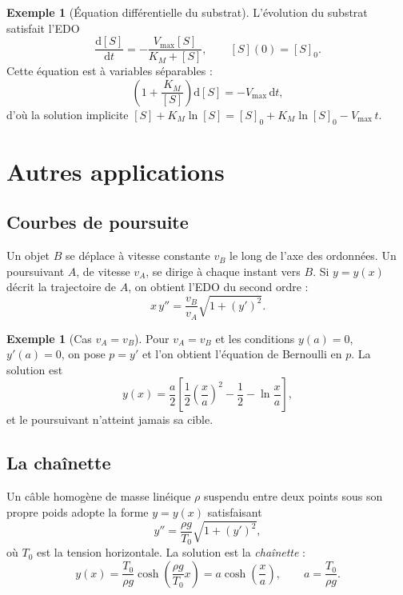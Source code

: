 \documentclass[12pt,a4paper,openany]{book}
\theoremstyle{definition}
\newtheorem{exemple}[definition]{Exemple}
\theoremstyle{plain}
\theoremstyle{remark}
\newcommand{\dd}{\mathrm{d}}
\begin{document}
\begin{exemple}[Équation différentielle du substrat]
\label{ex:edo-substrat}
L'évolution du substrat satisfait l'EDO
\[
\frac{\dd [S]}{\dd t} = -\frac{V_{\max}[S]}{K_M + [S]},
\qquad [S](0) = [S]_0.
\]
Cette équation est à variables séparables :
\[
\left(1 + \frac{K_M}{[S]}\right)\dd[S] = -V_{\max}\, \dd t,
\]
d'où la solution implicite
$[S] + K_M \ln [S] = [S]_0 + K_M \ln [S]_0 - V_{\max}\, t$.
\end{exemple}

\section{Autres applications}
\label{sec:autres-applications}

\subsection{Courbes de poursuite}
\label{subsec:poursuite}

Un objet $B$ se déplace à vitesse constante $v_B$ le long de l'axe
des ordonnées. Un poursuivant $A$, de vitesse $v_A$, se dirige à
chaque instant vers $B$. Si $y = y(x)$ décrit la trajectoire de $A$,
on obtient l'EDO du second ordre :
\begin{equation}
\label{eq:poursuite}
x\, y'' = \frac{v_B}{v_A}\sqrt{1 + (y')^2}.
\end{equation}

\begin{exemple}[Cas $v_A = v_B$]
\label{ex:poursuite-egal}
Pour $v_A = v_B$ et les conditions $y(a) = 0$, $y'(a) = 0$,
on pose $p = y'$ et l'on obtient l'équation de Bernoulli en $p$.
La solution est
\[
y(x) = \frac{a}{2}\left[\frac{1}{2}\left(\frac{x}{a}\right)^2
- \frac{1}{2} - \ln\frac{x}{a}\right],
\]
et le poursuivant n'atteint jamais sa cible.
\end{exemple}

\subsection{La chaînette}
\label{subsec:chainette}

Un câble homogène de masse linéique $\rho$ suspendu entre deux
points sous son propre poids adopte la forme $y = y(x)$ satisfaisant
\begin{equation}
\label{eq:chainette}
y'' = \frac{\rho g}{T_0}\sqrt{1 + (y')^2},
\end{equation}
où $T_0$ est la tension horizontale. La solution est la
\emph{chaînette} :
\[
y(x) = \frac{T_0}{\rho g}\cosh\!\left(\frac{\rho g}{T_0}x\right)
= a\cosh\!\left(\frac{x}{a}\right),
\qquad a = \frac{T_0}{\rho g}.
\]
\end{document}

